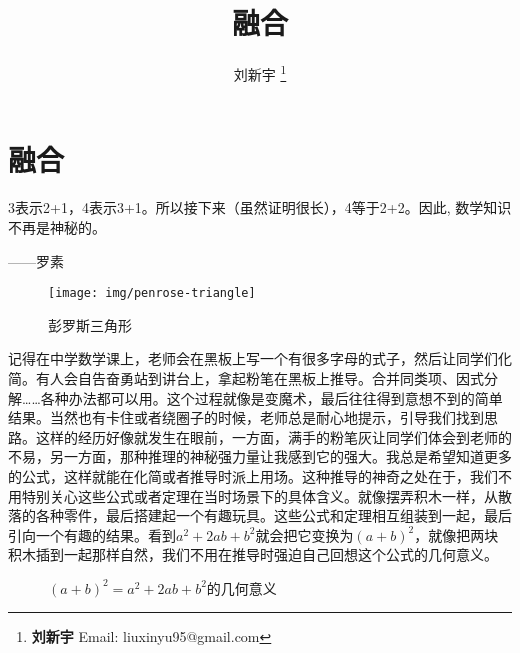\documentclass[b5paper]{ctexart}
\begin{document}
\title{融合}

\author{刘新宇
\thanks{{\bfseries 刘新宇} \newline
  Email: liuxinyu95@gmail.com \newline}
  }

\maketitle
\fi


\ifx\wholebook\relax
\chapter{融合}
\fi

\epigraph{3表示2+1，4表示3+1。所以接下来（虽然证明很长），4等于2+2。因此, 数学知识不再是神秘的。}{——罗素}


\begin{figure}[htbp]
 \centering
 \texttt{[image: img/penrose-triangle]}
 \caption{彭罗斯三角形}
 \label{fig:Penrose-triangle}
\end{figure}

记得在中学数学课上，老师会在黑板上写一个有很多字母的式子，然后让同学们化简。有人会自告奋勇站到讲台上，拿起粉笔在黑板上推导。合并同类项、因式分解……各种办法都可以用。这个过程就像是变魔术，最后往往得到意想不到的简单结果。当然也有卡住或者绕圈子的时候，老师总是耐心地提示，引导我们找到思路。这样的经历好像就发生在眼前，一方面，满手的粉笔灰让同学们体会到老师的不易，另一方面，那种推理的神秘强力量让我感到它的强大。我总是希望知道更多的公式，这样就能在化简或者推导时派上用场。这种推导的神奇之处在于，我们不用特别关心这些公式或者定理在当时场景下的具体含义。就像摆弄积木一样，从散落的各种零件，最后搭建起一个有趣玩具。这些公式和定理相互组装到一起，最后引向一个有趣的结果。看到$a^2 + 2ab + b^2$就会把它变换为$(a+b)^2$，就像把两块积木插到一起那样自然，我们不用在推导时强迫自己回想这个公式的几何意义。

\begin{figure}[htbp]
\centering
{}
\caption{$(a + b)^2 = a^2 + 2ab + b^2$的几何意义}
\end{figure}
\end{document}
